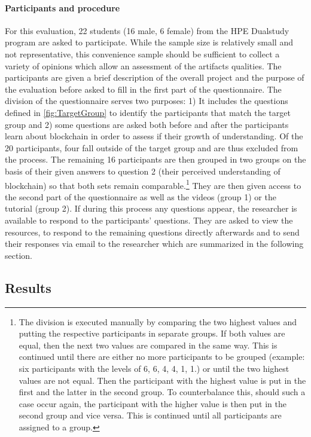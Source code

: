 \paragraph{Participants and procedure}
For this evaluation, 22 students (16 male, 6 female) from the HPE Dualstudy program are asked to participate. While the sample size is relatively small and not representative, this convenience sample should be sufficient to collect a variety of opinions which allow an assessment of the artifacts qualities. The participants are given a brief description of the overall project and the purpose of the evaluation before asked to fill in the first part of the questionnaire. The division of the questionnaire serves two purposes: 1) It includes the questions defined in \ref{fig:TargetGroup} to identify the participants that match the target group and 2) some questions are asked both before and after the participants learn about blockchain in order to assess if their growth of understanding. Of the 20 participants, four fall outside of the target group and are thus excluded from the process. The remaining 16 participants are then grouped in two groups on the basis of their given answers to question 2 (their perceived understanding of blockchain) so that both sets remain comparable.\footnote{The division is executed manually by comparing the two highest values and putting the respective participants in separate groups. If both values are equal, then the next two values are compared in the same way. This is continued until there are either no more participants to be grouped (example: six participants with the levels of 6, 6, 4, 4, 1, 1.) or until the two highest values are not equal. Then the participant with the highest value is put in the first and the latter in the second group. To counterbalance this, should such a case occur again, the participant with the higher value is then put in the second group and vice versa. This is continued until all participants are assigned to a group.}
They are then given access to the second part of the questionnaire as well as the videos (group 1) or the tutorial (group 2). If during this process any questions appear, the researcher is available to respond to the participants' questions. They are asked to view the resources, to respond to the remaining questions directly afterwards and to send their responses via email to the researcher which are summarized in the following section.

\subsection{Results} \label{subsec:EvaluationResults}

